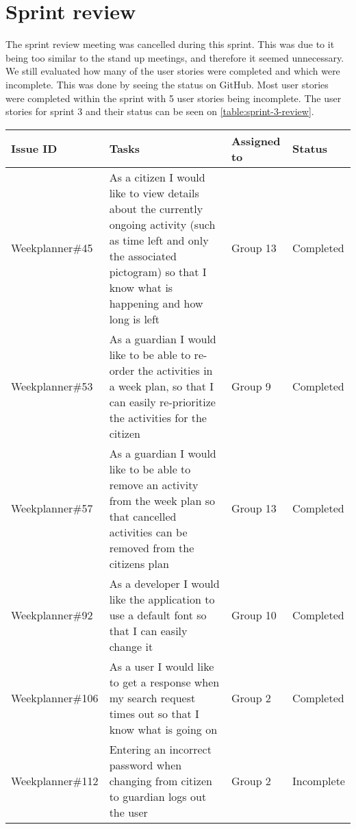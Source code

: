 \section{Sprint review}
The sprint review meeting was cancelled during this sprint. 
This was due to it being too similar to the stand up meetings, and therefore it seemed unnecessary. 
We still evaluated how many of the user stories were completed and which were incomplete.
This was done by seeing the status on GitHub.
Most user stories were completed within the sprint with 5 user stories being incomplete.    
The user stories for sprint 3 and their status can be seen on \autoref{table:sprint-3-review}.
\begin{longtable}{|p{2.9cm}|p{8cm}|p{2cm}|p{2cm}|}
    \hline
    Issue ID        & Tasks                                                                                                                                                                                    & Assigned to  & Status   \\ \hline
    Weekplanner\#45 & As a citizen I would like to view details about the currently ongoing activity (such as time left and only the associated pictogram) so that I know what is happening and how long is left & Group 13   & Completed         \\ \hline
    Weekplanner\#53 & As a guardian I would like to be able to re-order the activities in a week plan, so that I can easily re-prioritize the activities for the citizen                                      & Group 9       & Completed         \\ \hline
    Weekplanner\#57 & As a guardian I would like to be able to remove an activity from the week plan so that cancelled activities can be removed from the citizens plan                                    & Group 13         & Completed         \\ \hline
    Weekplanner\#92 & As a developer I would like the application to use a default font so that I can easily change it                                                                                       & Group 10       & Completed     \\ \hline
    Weekplanner\#106 & As a user I would like to get a response when my search request times out so that I know what is going on                                                                             & Group 2        & Completed    \\ \hline
    Weekplanner\#112 & Entering an incorrect password when changing from citizen to guardian logs out the user                                                                                                  & Group 2     & Incomplete    \\ \hline

\end{longtable}

